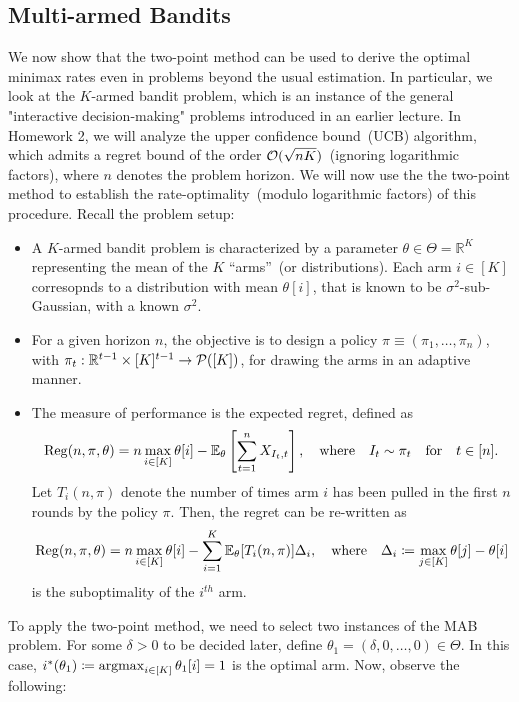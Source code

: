 \documentclass[12pt]{article}
\begin{document}
\subsection{Multi-armed Bandits}
\label{subsec:two-point-multiarmed-bandits}


We now show that the two-point method can be used to derive the optimal minimax rates even in problems beyond the usual estimation. In particular, we look at the $K$-armed bandit problem, which is an instance of the general "interactive decision-making" problems introduced in an earlier lecture. In Homework 2, we will analyze the upper confidence bound~(UCB) algorithm, which admits a regret bound of the order $\mathcal{O}(\sqrt{n K})$~(ignoring logarithmic factors), where $n$ denotes the problem horizon. We will now use the the two-point method to establish the rate-optimality~(modulo logarithmic factors) of this procedure. Recall the problem setup: 
\begin{itemize}
	\item A $K$-armed bandit problem is characterized by a parameter $\theta \in \Theta = \mathbb{R}^K$ representing the mean of the $K$ ``arms''~(or distributions). Each arm $i \in [K]$ corresopnds to a distribution with mean $\theta[i]$, that is known to be $\sigma^2$-sub-Gaussian, with a known $\sigma^2$. 
	\item For a given horizon $n$, the objective is to design a policy $\pi \equiv (\pi_1, \ldots, \pi_n)$, with $\pi_t:\mathbb{R}^{t-1}\times[K]^{t-1} \to {\cal P}([K])$,  for drawing the arms in an adaptive manner. 
	\item The measure of performance is the expected regret, defined as 
	\begin{align}
		\mathrm{Reg}(n, \pi, \theta) = n \max_{i \in [K]} \theta[i] - \mathbb{E}_{\theta}\left[ \sum_{t=1}^n X_{I_t, t} \right], \quad \text{where} \quad I_t \sim \pi_t \quad \text{for} \quad t\in [n]. 
	\end{align}
	Let $T_i(n, \pi)$ denote the number of times arm $i$ has been pulled in the first $n$ rounds by the policy $\pi$. Then, the regret can be re-written as 
	\begin{align}
	\mathrm{Reg}(n, \pi, \theta) = n \max_{i \in [K]} \theta[i] - \sum_{i=1}^K \mathbb{E}_{\theta}[T_i(n, \pi)] \Delta_i, \quad \text{where} \quad \Delta_i \coloneqq \max_{j\in [K]} \theta[j] - \theta[i] 
	\end{align}
	is the suboptimality of the $i^{th}$ arm. 
\end{itemize}
To apply the two-point method, we need to select two instances of the MAB problem. For some $\delta>0$ to be decided later, define $\theta_1 = (\delta, 0, \ldots, 0) \in \Theta$. In this case, $i^*(\theta_1) \coloneqq \operatorname*{argmax}_{i \in [K]} \theta_1[i] = 1$ is the optimal arm. Now, observe the following: 
\end{document}
